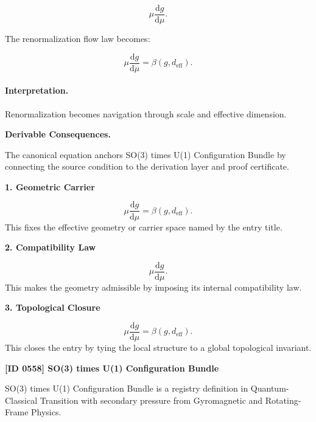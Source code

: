 \begin{equation}
\mu\frac{\mathrm{d}g}{\mathrm{d}\mu}.
\end{equation}

The renormalization flow law becomes:

\begin{equation}
\boxed{
\mu\frac{\mathrm{d}g}{\mathrm{d}\mu}
=
\beta(g,d_{\mathrm{eff}}).
}
\end{equation}

\paragraph{Interpretation.}
Renormalization becomes navigation through scale and effective dimension.

\par\vspace{0.35em}
\noindent\textbf{Derivable Consequences.}\quad
\begingroup
\footnotesize
\raggedright
The canonical equation anchors SO(3) times U(1) Configuration Bundle by connecting the source condition to the derivation layer and proof certificate.
\par\endgroup

\noindent\textbf{1. Geometric Carrier}\par
\[
\mu\frac{\mathrm{d}g}{\mathrm{d}\mu} = \beta(g,d_{\mathrm{eff}}).
\]
\noindent This fixes the effective geometry or carrier space named by the entry title.\par
\noindent\textbf{2. Compatibility Law}\par
\[
\mu\frac{\mathrm{d}g}{\mathrm{d}\mu}.
\]
\noindent This makes the geometry admissible by imposing its internal compatibility law.\par
\noindent\textbf{3. Topological Closure}\par
\[
\boxed{ \mu\frac{\mathrm{d}g}{\mathrm{d}\mu} = \beta(g,d_{\mathrm{eff}}). }
\]
\noindent This closes the entry by tying the local structure to a global topological invariant.\par

\clearpage
\noindent\textbf{[ID 0558] SO(3) times U(1) Configuration Bundle}\par
\vspace{0.35em}
\begingroup\small
{}
SO(3) times U(1) Configuration Bundle is a registry definition in Quantum-Classical Transition with secondary pressure from Gyromagnetic and Rotating-Frame Physics.

